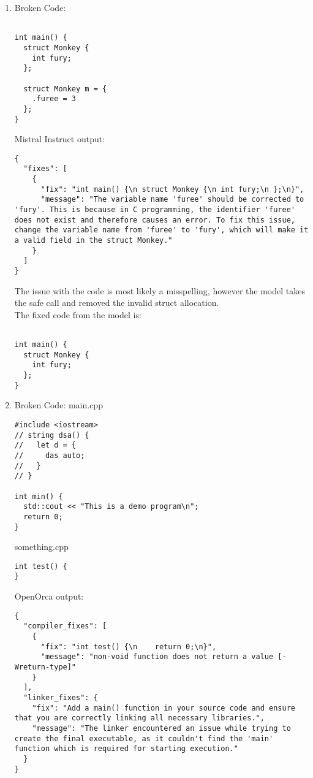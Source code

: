 \documentclass{article}
\begin{document}
\begin{enumerate}
			\item
			Broken Code:
			\begin{verbatim}

int main() {
  struct Monkey {
    int fury;
  };

  struct Monkey m = {
    .furee = 3
  };
}
			\end{verbatim}
			Mistral Instruct output:
			\begin{verbatim}
{
  "fixes": [
    {
      "fix": "int main() {\n struct Monkey {\n int fury;\n };\n}",
      "message": "The variable name 'furee' should be corrected to 'fury'. This is because in C programming, the identifier 'furee' does not exist and therefore causes an error. To fix this issue, change the variable name from 'furee' to 'fury', which will make it a valid field in the struct Monkey."
    }
  ]
}		\end{verbatim}
			The issue with the code is most likely a misspelling, however the model takes the safe call and removed the invalid struct allocation. \\
			The fixed code from the model is:
			\begin{verbatim}

int main() {
  struct Monkey {
    int fury;
  };
}
			\end{verbatim}

			\item
			Broken Code:
			main.cpp
			\begin{verbatim}
#include <iostream>
// string dsa() {
//   let d = {
//     das auto;
//   }
// }

int min() {
  std::cout << "This is a demo program\n";
  return 0;
}
			\end{verbatim}
			something.cpp
			\begin{verbatim}
int test() {
}
			\end{verbatim}
			OpenOrca output:
			\begin{verbatim}
{
  "compiler_fixes": [
    {
      "fix": "int test() {\n    return 0;\n}",
      "message": "non-void function does not return a value [-Wreturn-type]"
    }
  ],
  "linker_fixes": {
    "fix": "Add a main() function in your source code and ensure that you are correctly linking all necessary libraries.",
    "message": "The linker encountered an issue while trying to create the final executable, as it couldn't find the 'main' function which is required for starting execution."
  }
}
			\end{verbatim}


\end{enumerate}
\end{document}
